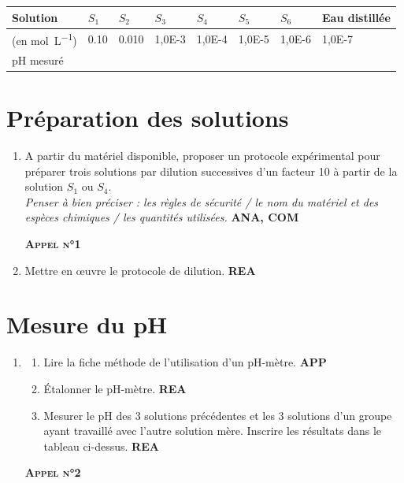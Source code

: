 \documentclass[a4paper,11pt,fleqn]{scrartcl}%
\begin{document}
\begin{table}[h]
	\begin{tabular}{|>{\centering}m{} |>{\centering}m{ }|>{\centering}m{} |>{\centering}m{} |>{\centering}m{} |>{\centering}m{} |>{\centering}m{} |>{\centering\arraybackslash}m{} |}
	\hline
	Solution &$S_1$&$S_2$&$S_3$&$S_4$&$S_5$&$S_6$&Eau distillée\\
	\hline
	[\ce{H3O+}] (en \unit{\mole\per\liter})& \num{0,10} & \num{0,010} & \num{1,0E-3} & \num{1,0E-4} &\num{1,0E-5}& \num{1,0E-6} & \num{1,0E-7}\\
	\hline
	pH mesuré&&&&&&&\rule[1cm]{0cm}{0cm}\\
	\hline
	\end{tabular}
\end{table}
	
\section{Préparation des solutions}
\begin{enumerate}
	\item A partir du matériel disponible, proposer un protocole expérimental pour préparer trois solutions par dilution successives d'un facteur 10 à partir de la solution $S_1$ ou $S_4$.\\ \textit{Penser à bien préciser : les règles de sécurité / le nom du matériel et des espèces chimiques / les quantités utilisées.} \textcolor{gray!80!blue}{\textbf{ANA, COM}}
	\begin{center}
	\textbf{\textsc{Appel n°1}}
	\end{center}
	\item Mettre en œuvre le protocole de dilution. \textcolor{gray!80!blue}{\textbf{REA}}
\end{enumerate}
\section{Mesure du pH}
\begin{enumerate}[resume]
	\item \begin{enumerate}
		\item Lire la fiche méthode de l'utilisation d'un pH-mètre. \textcolor{gray!80!blue}{\textbf{APP}}
		\item Étalonner le pH-mètre. \textcolor{gray!80!blue}{\textbf{REA}}
		\item Mesurer le pH des 3 solutions précédentes et les 3 solutions d'un groupe ayant travaillé avec l'autre solution mère. Inscrire les résultats dans le tableau ci-dessus. \textcolor{gray!80!blue}{\textbf{REA}}
	\end{enumerate}
	\begin{center}
	\textbf{\textsc{Appel n°2}}
	\end{center}
\end{enumerate}
\end{document}
